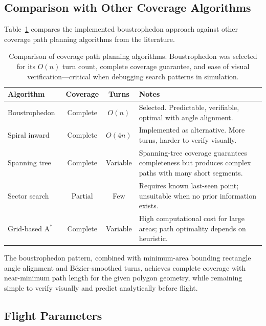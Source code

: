 \subsection{Comparison with Other Coverage Algorithms}\label{sec:comparison}

Table~\ref{tab:cpp-comparison} compares the implemented boustrophedon approach against other coverage path planning algorithms from the literature.

\begin{table}[ht]
  \centering\compactTable
  \caption{Comparison of coverage path planning algorithms.  Boustrophedon was selected for its $O(n)$ turn count, complete coverage guarantee, and ease of visual verification---critical when debugging search patterns in simulation.}\label{tab:cpp-comparison}
  \begin{tabularx}{\linewidth}{@{}l c c X@{}}
    \toprule
    \textbf{Algorithm} & \textbf{Coverage} & \textbf{Turns} & \textbf{Notes} \\
    \midrule
    Boustrophedon~\cite{choset2001coverage} & Complete & $O(n)$ & Selected. Predictable, verifiable, optimal with angle alignment. \\
    Spiral inward & Complete & $O(4n)$ & Implemented as alternative. More turns, harder to verify visually. \\
    Spanning tree~\cite{gabriely2001spanning} & Complete & Variable & Spanning-tree coverage guarantees completeness but produces complex paths with many short segments. \\
    Sector search & Partial & Few & Requires known last-seen point; unsuitable when no prior information exists. \\
    Grid-based A$^*$ & Complete & Variable & High computational cost for large areas; path optimality depends on heuristic. \\
    \bottomrule
  \end{tabularx}
\end{table}

The boustrophedon pattern, combined with minimum-area bounding rectangle angle alignment and B\'{e}zier-smoothed turns, achieves complete coverage with near-minimum path length for the given polygon geometry, while remaining simple to verify visually and predict analytically before flight.

\subsection{Flight Parameters}\label{sec:flight-params}


